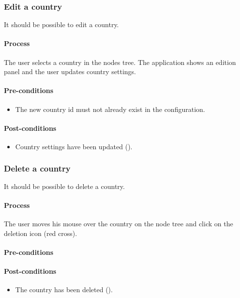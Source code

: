 \documentclass[11pt,a4paper,oneside]{article}
\begin{document}
\subsubsection{Edit a country}
It should be possible to edit a country.

\paragraph{Process}
The user selects a country in the nodes tree. The application shows an edition panel and the user updates country settings.

\paragraph{Pre-conditions}
\begin{itemize}
	\item The new country id must not already exist in the configuration.
\end{itemize}

\paragraph{Post-conditions}
\begin{itemize}
	\item Country settings have been updated ().
\end{itemize}

\subsubsection{Delete a country}
It should be possible to delete a country.

\paragraph{Process}
The user moves his mouse over the country on the node tree and click on the deletion icon (red cross).

\paragraph{Pre-conditions}

\paragraph{Post-conditions}
\begin{itemize}
	\item The country has been deleted ().
\end{itemize}
\end{document}
